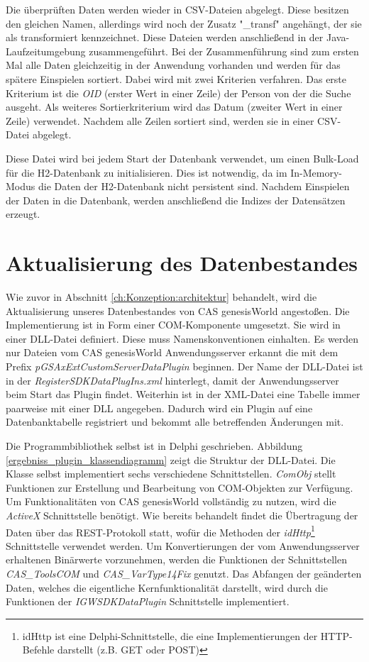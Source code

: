 Die überprüften Daten werden wieder in CSV-Dateien abgelegt. Diese besitzen den gleichen Namen, allerdings wird noch der Zusatz "\_transf" angehängt, der sie als transformiert kennzeichnet. Diese Dateien werden anschließend in der Java-Laufzeitumgebung zusammengeführt. Bei der Zusammenführung sind zum ersten Mal alle Daten gleichzeitig in der Anwendung vorhanden und werden für das spätere Einspielen sortiert. Dabei wird mit zwei Kriterien verfahren. Das erste Kriterium ist die \textit{OID} (erster Wert in einer Zeile) der Person von der die Suche ausgeht. Als weiteres Sortierkriterium wird das Datum (zweiter Wert in einer Zeile) verwendet. Nachdem alle Zeilen sortiert sind, werden sie in einer CSV-Datei abgelegt. 

Diese Datei wird bei jedem Start der Datenbank verwendet, um einen Bulk-Load für die H2-Datenbank zu initialisieren. Dies ist notwendig, da im In-Memory-Modus die Daten der H2-Datenbank nicht persistent sind. Nachdem Einspielen der Daten in die Datenbank, werden anschließend die Indizes der Datensätzen erzeugt.

\section{Aktualisierung des Datenbestandes}

Wie zuvor in Abschnitt \ref{ch:Konzeption:architektur} behandelt, wird die Aktualisierung unseres Datenbestandes von CAS genesisWorld angestoßen. Die Implementierung ist in Form einer COM-Komponente umgesetzt. Sie wird in einer DLL-Datei definiert. Diese muss Namenskonventionen einhalten. Es werden nur Dateien vom CAS genesisWorld Anwendungsserver erkannt die mit dem Prefix \textit{pGSAxExtCustomServerDataPlugin} beginnen. Der Name der DLL-Datei ist in der \textit{RegisterSDKDataPlugIns.xml} hinterlegt, damit der Anwendungsserver beim Start das Plugin findet. Weiterhin ist in der XML-Datei eine Tabelle immer paarweise mit einer DLL angegeben. Dadurch wird ein Plugin auf eine Datenbanktabelle registriert und bekommt alle betreffenden Änderungen mit.

Die Programmbibliothek selbst ist in Delphi geschrieben. Abbildung \ref{ergebniss_plugin_klassendiagramm} zeigt die Struktur der DLL-Datei. Die Klasse selbst implementiert sechs verschiedene Schnittstellen. \textit{ComObj} stellt Funktionen zur Erstellung und Bearbeitung von COM-Objekten zur Verfügung. Um Funktionalitäten von CAS genesisWorld vollständig zu nutzen, wird die \textit{ActiveX} Schnittstelle benötigt. Wie bereits behandelt findet die Übertragung der Daten über das REST-Protokoll statt, wofür die Methoden der \textit{idHttp}\footnote{idHttp ist eine Delphi-Schnittstelle, die eine Implementierungen der HTTP-Befehle darstellt (z.B. GET oder POST)} Schnittstelle verwendet werden. Um Konvertierungen der vom Anwendungsserver erhaltenen Binärwerte vorzunehmen, werden die Funktionen der Schnittstellen \textit{CAS\_ToolsCOM} und \textit{CAS\_VarType14Fix} genutzt. Das Abfangen der geänderten Daten, welches die eigentliche Kernfunktionalität darstellt, wird durch die Funktionen der \textit{IGWSDKDataPlugin} Schnittstelle implementiert.

